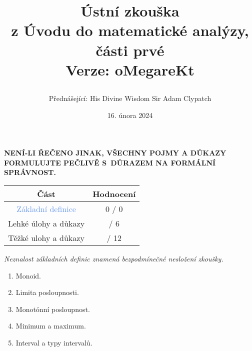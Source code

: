 \documentclass[a4paper,11pt]{article}
\title{\Huge\textsf{Ústní zkouška}\\
 \Large\textsf{z Úvodu do matematické analýzy, části prvé}\\
 \vspace*{1em}
 Verze: oMegareKt\\
 \author{Přednášející: His Divine Wisdom Sir Adam Clypatch}
 \date{16. února 2024}
}
\begin{document}
 \maketitle
 \begin{tcolorbox}[boxsep=3mm,arc=0mm,toprule=1pt,bottomrule=1pt,leftrule=-0.1mm,
   rightrule=-0.1mm,colframe=red!90!black]
  \vspace*{-2pt}
  \begin{center}
   \textbf{NENÍ-LI ŘEČENO JINAK, VŠECHNY POJMY A DŮKAZY FORMULUJTE PEČLIVĚ
   S~DŮRAZEM NA FORMÁLNÍ SPRÁVNOST.}
  \end{center}
 \end{tcolorbox}
 \vspace*{\fill}
 \begin{center}
  \begin{tabular}{c|c}
   \textsf{\textbf{Část}} & \textsf{\textbf{Hodnocení}}\\
   \toprule
   \textcolor{CornflowerBlue}{Základní definice} & 0 / 0\\
   \textcolor{Emerald}{Lehké úlohy a důkazy} & \hspace{2ex}/ 6\\
   \textcolor{BrickRed}{Těžké ulohy a důkazy} & \hspace{2ex} / 12
  \end{tabular}
 \end{center}
 \vspace*{\fill}
 \clearpage
 \begin{tcolorbox}[title=\textsf{Základní
   definice (0 bodů)},arc=0mm,boxsep=3mm,bottomrule=1pt,toprule=3pt,leftrule=-0.1mm,
   rightrule=-0.1mm,colframe=CornflowerBlue!80!white,
   colback=CornflowerBlue!5!white]
  \emph{Neznalost základních definic znamená bezpodmínečné nesložení
   zkoušky.}
  \begin{enumerate}
   \item Monoid.
   \item Limita posloupnosti.
   \item Monotónní posloupnost.
   \item Minimum a maximum.
   \item Interval a typy intervalů.
  \end{enumerate}
 \end{tcolorbox}
 \clearpage
\end{document}
